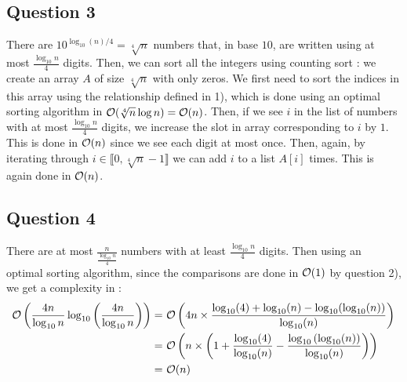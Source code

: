 \documentclass{cours}
\begin{document}
        \subsection{Question 3}
            There are $10^{\log_{10}(n)/4} = \sqrt[4]{n}$ numbers that, in base $10$, are written using at most $\frac{\log_{10}n}{4}$ digits. Then, we can sort all the integers using counting sort : we create an array $A$ of size $\sqrt[4]{n}$ with only zeros. We first need to sort the indices in this array using the relationship defined in 1), which is done using an optimal sorting algorithm in $\mathcal{O}(\sqrt[4]{n}\log n) = \mathcal{O}(n)$.
            Then, if we see $i$ in the list of numbers with at most $\frac{\log_{10} n}{4}$ digits, we increase the slot in array corresponding to $i$ by $1$. This is done in $\mathcal{O}(n)$ since we see each digit at most once. Then, again, by iterating through $i \in \llbracket 0, \sqrt[4]{n} - 1 \rrbracket$ we can add $i$ to a list $A[i]$ times. This is again done in $\mathcal{O}(n)$.

        \subsection{Question 4}
            There are at most $\frac{n}{\frac{\log_{10} n}{4}}$ numbers with at least $\frac{\log_{10} n}{4}$ digits. Then using an optimal sorting algorithm, since the comparisons are done in $\mathcal{O}(1)$ by question 2), we get a complexity in : 
            \[ 
                \begin{aligned}
                    \mathcal{O}\left(\frac{4n}{\log_{10}n}\log_{10}\left(\frac{4n}{\log_{10}n}\right)\right) = &\ \mathcal{O}\left(4n\times\frac{\log_{10}(4) + \log_{10}(n) - \log_{10}(\log_{10}(n))}{\log_{10}(n)}\right)\\
                    = &\ \mathcal{O}\left(n\times\left(1 + \frac{\log_{10}(4)}{\log_{10}(n)} - \frac{\log_{10}\left(\log_{10}(n)\right)}{\log_{10}(n)}\right)\right)\\
                    = &\ \mathcal{O}(n)
                \end{aligned}
            \]
\end{document}
